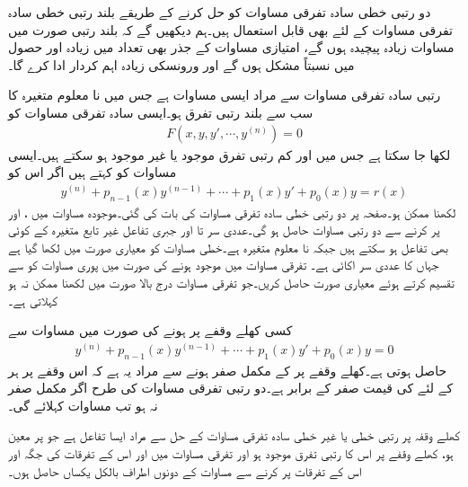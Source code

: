 دو رتبی خطی سادہ تفرقی مساوات کو حل کرنے کے طریقے بلند رتبی خطی سادہ تفرقی مساوات کے لئے بھی قابل استعمال ہیں۔ہم دیکھیں گے کہ بلند رتبی صورت میں مساوات زیادہ پیچیدہ ہوں گے،  امتیازی مساوات کے جذر بھی تعداد میں زیادہ اور حصول میں نسبتاً مشکل ہوں گے اور ورونسکی زیادہ اہم کردار ادا کرے گا۔ 

 رتبی سادہ تفرقی مساوات سے مراد ایسی مساوات ہے جس میں نا معلوم متغیرہ  کا  سب سے بلند رتبی تفرق ہو۔ایسی سادہ تفرقی مساوات کو
\begin{align*}
F(x,y,y',\cdots, y^{(n)})=0
\end{align*}
لکھا جا سکتا ہے جس میں  اور کم رتبی تفرق موجود یا غیر موجود ہو سکتے ہیں۔ایسی مساوات کو  کہتے ہیں اگر اس کو 
\begin{align}\label{مساوات_سادہ_بلند_خطی_الف}
y^{(n)}+p_{n-1}(x)y^{(n-1)}+\cdots+p_1(x)y'+p_0(x)y=r(x)
\end{align}
لکھنا ممکن ہو۔صفحہ  پر دو رتبی خطی سادہ تفرقی مساوات کی بات کی گئی۔موجودہ مساوات میں ،  اور  پر کرنے سے دو رتبی مساوات حاصل ہو گی۔عددی سر  تا   اور جبری تفاعل  غیر تابع متغیرہ   کے کوئی بھی تفاعل ہو سکتے ہیں جبکہ  نا معلوم متغیرہ ہے۔خطی مساوات کو معیاری صورت میں لکھا گیا ہے جہاں  کا عددی سر اکائی  ہے۔ تفرقی مساوات میں   موجود ہونے کی صورت میں پوری مساوات کو  سے تقسیم کرتے ہوئے معیاری صورت حاصل کریں۔جو تفرقی مساوات درج بالا صورت میں لکھنا ممکن نہ ہو  کہلاتی ہے۔

کسی کھلے وقفے  پر    ہونے کی صورت میں  مساوات  سے 
\begin{align}\label{مساوات_سادہ_بلند_خطی_ب}
y^{(n)}+p_{n-1}(x)y^{(n-1)}+\cdots+p_1(x)y'+p_0(x)y=0
\end{align}
حاصل ہوتی ہے۔کھلے وقفے پر  کے مکمل صفر ہونے سے مراد یہ ہے کہ اس وقفے پر ہر  کے لئے  کی قیمت صفر کے برابر ہے۔دو رتبی تفرقی مساوات کی طرح  اگر  مکمل صفر نہ ہو تب مساوات  کہلائے گی۔

کھلے وقفہ  پر  رتبی خطی یا غیر خطی سادہ تفرقی مساوات کے حل  سے مراد ایسا تفاعل ہے جو  پر معین ہو،  کھلے وقفے پر اس کا  رتبی تفرق موجود ہو اور تفرقی مساوات میں  اور اس کے تفرقات کی جگہ  اور اس کے تفرقات پر کرنے سے مساوات کے دونوں اطراف بالکل یکساں حاصل ہوں۔ 

